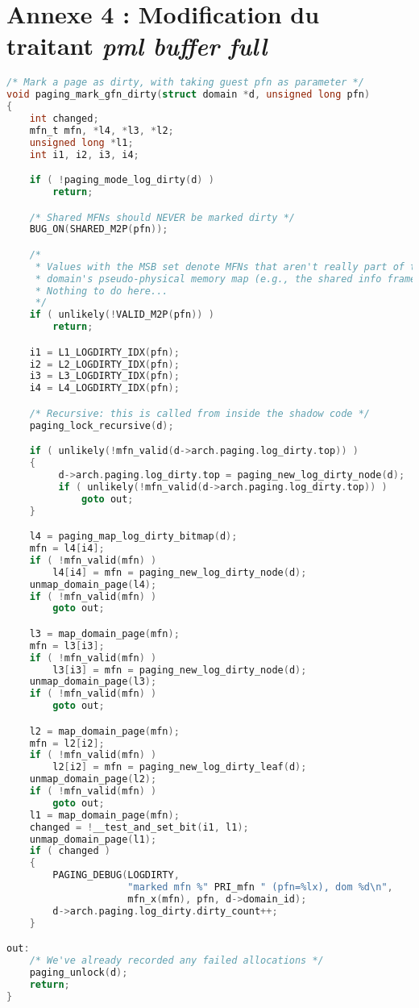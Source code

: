 \section{Annexe 4 : Modification du traitant \textit{pml buffer full}}
\label{section:pml_buffer_full}

\begin{lstlisting}[language=C, caption=Méthode appelée lors de l'évènement \textit{pml buffer full} avant modification, label={lst:pml_buffer_full_avant}]
/* Mark a page as dirty, with taking guest pfn as parameter */
void paging_mark_gfn_dirty(struct domain *d, unsigned long pfn)
{
    int changed;
    mfn_t mfn, *l4, *l3, *l2;
    unsigned long *l1;
    int i1, i2, i3, i4;

    if ( !paging_mode_log_dirty(d) )
        return;

    /* Shared MFNs should NEVER be marked dirty */
    BUG_ON(SHARED_M2P(pfn));

    /*
     * Values with the MSB set denote MFNs that aren't really part of the
     * domain's pseudo-physical memory map (e.g., the shared info frame).
     * Nothing to do here...
     */
    if ( unlikely(!VALID_M2P(pfn)) )
        return;

    i1 = L1_LOGDIRTY_IDX(pfn);
    i2 = L2_LOGDIRTY_IDX(pfn);
    i3 = L3_LOGDIRTY_IDX(pfn);
    i4 = L4_LOGDIRTY_IDX(pfn);

    /* Recursive: this is called from inside the shadow code */
    paging_lock_recursive(d);

    if ( unlikely(!mfn_valid(d->arch.paging.log_dirty.top)) ) 
    {
         d->arch.paging.log_dirty.top = paging_new_log_dirty_node(d);
         if ( unlikely(!mfn_valid(d->arch.paging.log_dirty.top)) )
             goto out;
    }

    l4 = paging_map_log_dirty_bitmap(d);
    mfn = l4[i4];
    if ( !mfn_valid(mfn) )
        l4[i4] = mfn = paging_new_log_dirty_node(d);
    unmap_domain_page(l4);
    if ( !mfn_valid(mfn) )
        goto out;

    l3 = map_domain_page(mfn);
    mfn = l3[i3];
    if ( !mfn_valid(mfn) )
        l3[i3] = mfn = paging_new_log_dirty_node(d);
    unmap_domain_page(l3);
    if ( !mfn_valid(mfn) )
        goto out;

    l2 = map_domain_page(mfn);
    mfn = l2[i2];
    if ( !mfn_valid(mfn) )
        l2[i2] = mfn = paging_new_log_dirty_leaf(d);
    unmap_domain_page(l2);
    if ( !mfn_valid(mfn) )
        goto out;
    l1 = map_domain_page(mfn);
    changed = !__test_and_set_bit(i1, l1);
    unmap_domain_page(l1);
    if ( changed )
    {
        PAGING_DEBUG(LOGDIRTY,
                     "marked mfn %" PRI_mfn " (pfn=%lx), dom %d\n",
                     mfn_x(mfn), pfn, d->domain_id);
        d->arch.paging.log_dirty.dirty_count++;
    }

out:
    /* We've already recorded any failed allocations */
    paging_unlock(d);
    return;
}
\end{lstlisting}

